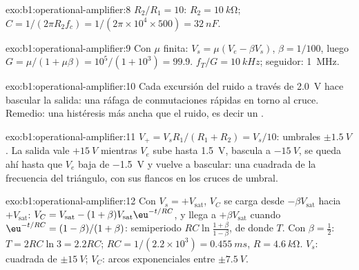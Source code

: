 \begin{solution}{exo:b1:operational-amplifier:8}
$R_2/R_1 = 10$: $R_2 = \qty{10}{k\ohm}$; $C = 1/(2\pi R_2f_c) = 1/(2\pi
\times 10^4 \times 500) = \qty{32}{nF}$.
\end{solution}

\begin{solution}{exo:b1:operational-amplifier:9}
Con $\mu$ finita: $V_s = \mu(V_e - \beta V_s)$, $\beta = 1/100$, luego
$G = \mu/(1 + \mu\beta) = 10^5/(1 + 10^3) = 99.9$.  $f_T/G =
\qty{10}{kHz}$; seguidor: \qty{1}{MHz}.
\end{solution}

\begin{solution}{exo:b1:operational-amplifier:10}
Cada excursión del ruido a través de \qty{2.0}{V} hace bascular la salida:
una ráfaga de conmutaciones rápidas en torno al cruce. Remedio: una
histéresis más ancha que el ruido, es decir un .
\end{solution}

\begin{solution}{exo:b1:operational-amplifier:11}
$V_+ = V_sR_1/(R_1 + R_2) = V_s/10$: umbrales $\pm\qty{1.5}{V}$. La salida
vale $+\qty{15}{V}$ mientras $V_e$ sube hasta \qty{1.5}{V}, bascula a
$-\qty{15}{V}$, se queda ahí hasta que $V_e$ baja de \qty{-1.5}{V} y
vuelve a bascular: una  cuadrada de la frecuencia del triángulo, con
sus flancos en los cruces de umbral.
\end{solution}

\begin{solution}{exo:b1:operational-amplifier:12}
Con $V_s = +V_{\mathrm{sat}}$, $V_C$ se carga desde $-\beta V_{\mathrm{sat}}$
hacia $+V_{\mathrm{sat}}$: $V_C = V_{\mathrm{sat}} - (1 + \beta)V_{\mathrm{sat}}
\eu^{-t/RC}$, y llega a $+\beta V_{\mathrm{sat}}$ cuando $\eu^{-t/RC} =
(1 - \beta)/(1 + \beta)$: semiperiodo $RC\ln\frac{1 + \beta}{1 - \beta}$,
de donde $T$. Con $\beta = \tfrac12$: $T = 2RC\ln 3 = 2.2RC$; $RC = 1/(2.2 \times
10^3) = \qty{0.455}{ms}$, $R = \qty{4.6}{k\ohm}$. $V_s$:  cuadrada de
$\pm\qty{15}{V}$; $V_C$: arcos exponenciales entre $\pm\qty{7.5}{V}$.
\end{solution}

